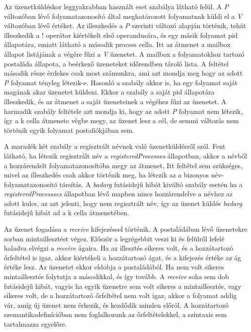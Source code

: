 Az üzenetküldéskor leggyakrabban használt eset szabálya látható felül. A \textit{P} változóban lévő folyamatazonosító által meghatározott folyamatnak küldi el a \textit{V} változóban lévő értéket. Az illeszkedés a \textit{P} szerinti változó alapján történik, tehát illeszkedik a ! operátor kiértékelt első operandusára, és egy másik folyamat pid állapotára, emiatt látható a második process cella. Itt az átmenet a mailbox állapot listájának a végére fűzi a \textit{V} üzenetet. A mailbox a folyamatokhoz tartozó postaláda állapota, a beérkező üzeneteket időrendben tároló lista. A feltétel második része érdekes csak most számunkra, ami azt mondja meg hogy az adott \textit{P} folyamat tényleg létezik-e. Hasonló a szabály akkor is, ha egy folyamat saját magának akar üzenetet küldeni. Ekkor a szabály a saját pid állapotára illeszkedik, és az átmenet a saját üzeneteinek a végéhez fűzi az üzenetet. A harmadik szabály feltétele azt mondja ki, hogy az adott \textit{P} folyamat nem létezik, így a k cella átmenete végbe megy, az üzenet lesz a cél, de semmi változás nem történik egyik folyamat postafiókjában sem.



A maradék két szabály a regisztrált névnek való üzenetküldésről szól. Fent látható, ha létezik regisztrált név a \textit{registeredProcesses} állapotban, akkor a névből a hozzárendelt folyamatazonosítóba megy az átmenet. Itt feltétel sem szükséges, mivel az illeszkedés csak akkor történik meg, ha létezik az a bizonyos név-folyamatazonosító társítás. A \textit{badarg} futásidejű hibát kiváltó szabály esetén ha a \textit{registeredProcessses} állapotban lévő mapben nincs hozzárendelve a névhez az adott kulcs, az azt jelenti, hogy nem regisztrált név, így az üzenet küldés \textit{badarg} futásidejű hibát ad a k cella átmenetében.

Az üzenet fogadása a \textit{receive} kifejezéssel történik. A postaládában lévő üzenetekre sorban mintaillesztést végez. Először a legrégebbit veszi ki és felülről lefelé haladva elvégzi a \textit{receive} ágaira. Ha az illesztés sikeres volt, és a hozzátartozó őrfeltétel is igaz, akkor kiértékeli a hozzátartozó ágat, és a kifejezés értéke az ág értéke lesz. Az üzenetet ekkor eldobja a postaládából. Ha nem volt sikeres mintaillesztés folytatja a másodikkal, és így tovább. A \textit{receive} soha sem dob futásidejű hibát, vagyis ha egyik üzenetre sem volt sikeres a mintaillesztés, vagy sikeres volt, de a hozzátartozó őrfeltétel nem volt igaz, akkor a folyamat addig vár, amíg új üzenet nem érkezik, és kezdődik minden előröl. A hozzátartozó szemantikadefinícióban nem foglalkozunk az őrfeltételekkel, a szintaxis sem tartalmazza egyelőre.

